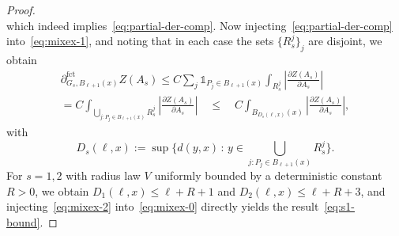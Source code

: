 \documentclass[AHL,Unicode,longabstracts]{cedram}
\newcommand{\parfct}[1]{\partial_{#1}^{\operatorname{fct}}}
\begin{document}
\begin{proof}
\[\]
which indeed implies~\eqref{eq:partial-der-comp}. Now injecting~\eqref{eq:partial-der-comp} into~\eqref{eq:mixex-1}, and noting that in each case the sets $\{R_s^j\}_j$ are disjoint, we obtain
\begin{multline}\label{eq:mixex-2}
\parfct{G_s,B_{\ell+1}(x)}Z(A_s)\le C\sum_j\mathds1_{P_j\in B_{\ell+1}(x)}\int_{R_s^j}\left|\frac{\partial Z(A_s)}{\partial A_s}\right|\\
=C\int_{\bigcup_{j:P_j\in B_{\ell+1}(x)}R_s^j}\left|\frac{\partial Z(A_s)}{\partial A_s}\right|\quad
\le\quad C\int_{B_{D_s(\ell,x)}(x)}\left|\frac{\partial Z(A_s)}{\partial A_s}\right|,
\end{multline}
with
\[
D_s(\ell,x):=\sup\Big\{d(y,x)\,:\,y\in \bigcup_{j:P_j\in B_{\ell+1}(x)}R_s^j\Big\}.
\]
For $s=1,2$ with radius law $V$ uniformly bounded by a deterministic constant $R>0$, we obtain $D_1(\ell,x)\le\ell+R+1$ and $D_2(\ell,x)\le\ell+R+3$, and injecting~\eqref{eq:mixex-2} into~\eqref{eq:mixex-0} directly yields the result~\eqref{eq:s1-bound}.


\end{proof}
\end{document}
